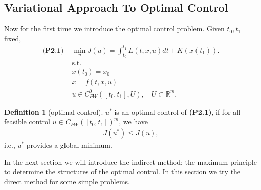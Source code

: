 \documentclass[a4paper,11pt,fleqn]{book}
\theoremstyle{definition}
\newtheorem{definition}{Definition}[section]
\theoremstyle{remark}
\begin{document}
\subsection{Variational Approach To Optimal Control}
Now for the first time we introduce the optimal control problem. Given $t_0, t_1$ fixed,  
\begin{equation}
\begin{aligned}
	\textbf{(P2.1) }
	& \min_{u } J(u)= \int_{t_0}^{t_1} L(t, x, u)dt + K(x(t_1)).\\
	& \text{s.t.}\\
	& x(t_0) = x_0\\
	& \dot{x} = f(t, x, u)\\
	& u \in C^0_{PW}([t_0, t_1], U), \quad U \subset \mathbb{R}^m.
\end{aligned}
\end{equation}

\begin{definition}[optimal control]
	$u^*$ is an optimal control of \textbf{(P2.1)}, if for all feasible control $u  \in C_{PW}([t_0, t_1])^m$, we have
	\begin{align*}
		J(u^*) \le J(u),
	\end{align*}
	i.e., $u^*$ provides a global minimum. 
\end{definition}


In the next section we will introduce the indirect method: the maximum principle to determine the structures of the optimal control. In this section we try the direct method for some simple problems. 
\end{document}
